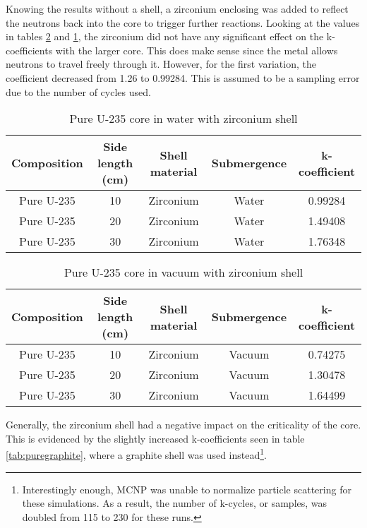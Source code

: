 Knowing the results without a shell, a zirconium enclosing was added to reflect the neutrons back into the core to trigger further reactions. Looking at the values in tables \ref{tab:purezrv} and \ref{tab:purezrw}, the zirconium did not have any significant effect on the k-coefficients with the larger core. This does make sense since the metal allows neutrons to travel freely through it. However, for the first variation, the coefficient decreased from 1.26 to 0.99284. This is assumed to be a sampling error due to the number of cycles used.

\begin{table}[!htbp]
\centering
\caption{Pure U-235 core in water with zirconium shell}
\label{tab:purezrw}
\begin{tabular}{|c|c|c|c|c|}
\hline
Composition & Side length (cm) & Shell material & Submergence & k-coefficient \\
\hline
Pure U-235  & 10               & Zirconium            & Water       & 0.99284      \\
\hline
Pure U-235  & 20               & Zirconium            & Water       & 1.49408       \\
\hline
Pure U-235  & 30               & Zirconium            & Water       & 1.76348       \\
\hline
\end{tabular}
\end{table}

\begin{table}[!htbp]
\centering
\caption{Pure U-235 core in vacuum with zirconium shell}
\label{tab:purezrv}
\begin{tabular}{|c|c|c|c|c|}
\hline
Composition & Side length (cm) & Shell material & Submergence & k-coefficient \\
\hline
Pure U-235  & 10               & Zirconium            & Vacuum       & 0.74275      \\
\hline
Pure U-235  & 20               & Zirconium            & Vacuum       & 1.30478       \\
\hline
Pure U-235  & 30               & Zirconium            & Vacuum       & 1.64499       \\
\hline
\end{tabular}
\end{table}

Generally, the zirconium shell had a negative impact on the criticality of the core. This is evidenced by the slightly increased k-coefficients seen in table \ref{tab:puregraphite}, where a graphite shell was used instead\footnote{Interestingly enough, MCNP was unable to normalize particle scattering for these simulations. As a result, the number of k-cycles, or samples, was doubled from 115 to 230 for these runs.}.


